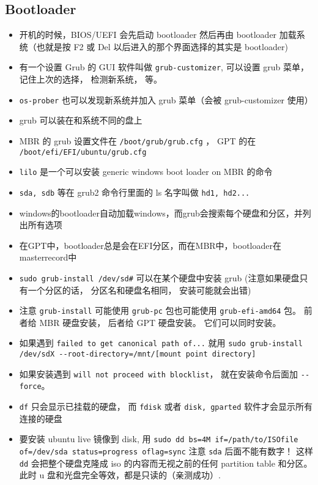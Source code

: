 \subsection{Bootloader}
\begin{itemize}
\item 开机的时候，BIOS/UEFI 会先启动 bootloader 然后再由 bootloader 加载系统（也就是按 F2 或 Del 以后进入的那个界面选择的其实是 bootloader)
\item 有一个设置 Grub 的 GUI 软件叫做 \verb|grub-customizer|, 可以设置 grub 菜单， 记住上次的选择， 检测新系统， 等。
\item \verb|os-prober| 也可以发现新系统并加入 grub 菜单（会被 grub-customizer 使用）
\item grub 可以装在和系统不同的盘上
\item MBR 的 grub 设置文件在 \verb|/boot/grub/grub.cfg| ， GPT 的在 \verb|/boot/efi/EFI/ubuntu/grub.cfg|
\item \verb|lilo| 是一个可以安装 generic windows boot loader on MBR 的命令
\item \verb|sda, sdb| 等在 grub2 命令行里面的 ls 名字叫做 \verb|hd1, hd2...|
\item windows的bootloader自动加载windows，而grub会搜索每个硬盘和分区，并列出所有选项
\item 在GPT中，bootloader总是会在EFI分区，而在MBR中，bootloader在masterrecord中
\item \verb|sudo grub-install /dev/sd#| 可以在某个硬盘中安装 grub (注意如果硬盘只有一个分区的话， 分区名和硬盘名相同， 安装可能就会出错)
\item 注意 \verb|grub-install| 可能使用 \verb|grub-pc| 包也可能使用 \verb|grub-efi-amd64| 包。 前者给 MBR 硬盘安装， 后者给 GPT 硬盘安装。 它们可以同时安装。
\item 如果遇到 \verb|failed to get canonical path of...| 就用 \verb|sudo grub-install /dev/sdX --root-directory=/mnt/[mount point directory]|
\item 如果安装遇到 \verb|will not proceed with blocklist|， 就在安装命令后面加 \verb|--force|。
\item \verb|df| 只会显示已挂载的硬盘， 而 \verb|fdisk| 或者 \verb|disk, gparted| 软件才会显示所有连接的硬盘
\item 要安装 ubuntu live 镜像到 disk, 用 \verb|sudo dd bs=4M if=/path/to/ISOfile of=/dev/sda status=progress oflag=sync| 注意 \verb|sda| 后面不能有数字！ 这样 \verb|dd| 会把整个硬盘克隆成 iso 的内容而无视之前的任何 partition table 和分区。 此时 u 盘和光盘完全等效，都是只读的（亲测成功）.
\end{itemize}

